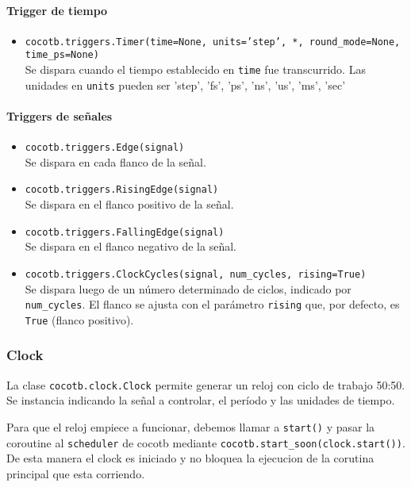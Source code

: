 \documentclass[a4paper,12pt]{article}
\begin{document}
\paragraph{Trigger de tiempo}

\begin{itemize}
	\item \texttt{cocotb.triggers.Timer(time=None, units='step', *, round\_mode=None, time\_ps=None)}
	\\
	Se dispara cuando el tiempo establecido en \texttt{time} fue transcurrido. Las unidades en \texttt{units} pueden ser 'step', 'fs', 'ps', 'ns', 'us', 'ms', 'sec'
\end{itemize}


\paragraph{Triggers de señales}

\begin{itemize}
	\item \texttt{cocotb.triggers.Edge(signal)}
	\\
	Se dispara en cada flanco de la señal.
	
	\item \texttt{cocotb.triggers.RisingEdge(signal)}
	\\
	Se dispara en el flanco positivo de la señal.
	
	\item \texttt{cocotb.triggers.FallingEdge(signal)}
	\\
	Se dispara en el flanco negativo de la señal.
	\\
	\item \texttt{cocotb.triggers.ClockCycles(signal, num\_cycles, rising=True)}\\
	Se dispara luego de un número determinado de ciclos, indicado por \texttt{num\_cycles}.  
	El flanco se ajusta con el parámetro \texttt{rising} que, por defecto, es \texttt{True} (flanco positivo).
\end{itemize}

\subsubsection{Clock}

La clase \texttt{cocotb.clock.Clock} permite generar un reloj con ciclo de trabajo 50:50.  
Se instancia indicando la señal a controlar, el período y las unidades de tiempo.  

Para que el reloj empiece a funcionar, debemos llamar a \texttt{start()} y pasar la coroutine al \texttt{scheduler} de cocotb mediante \texttt{cocotb.start\_soon(clock.start())}. De esta manera el clock es iniciado y no bloquea la ejecucion de la corutina principal que esta corriendo.
\end{document}
